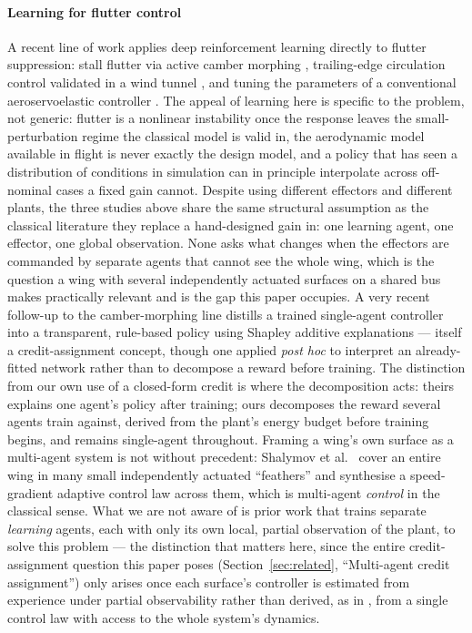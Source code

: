 \documentclass[preprint,11pt,authoryear]{elsarticle}
\begin{document}
\paragraph{Learning for flutter control}
A recent line of work applies deep reinforcement learning directly to flutter
suppression: stall flutter via active camber morphing
\citep{stallflutter2025}, trailing-edge circulation control validated in a wind
tunnel \citep{circulation2023}, and tuning the parameters of a conventional
aeroservoelastic controller \citep{flyingwing2022}. The appeal of learning here
is specific to the problem, not generic: flutter is a nonlinear instability once
the response leaves the small-perturbation regime the classical model is valid
in, the aerodynamic model available in flight is never exactly the design model,
and a policy that has seen a distribution of conditions in simulation can in
principle interpolate across off-nominal cases a fixed gain cannot. Despite
using different effectors and different plants, the three studies above share
the same structural assumption as the classical literature they replace a
hand-designed gain in: one learning agent, one effector, one global observation.
None asks what changes when the effectors are commanded by separate agents that
cannot see the whole wing, which is the question a wing with several
independently actuated surfaces on a shared bus makes practically relevant and
is the gap this paper occupies. A very recent follow-up to the camber-morphing
line distills a trained single-agent controller into a transparent, rule-based
policy using Shapley additive explanations \citep{shapley2026stallflutter} ---
itself a credit-assignment concept, though one applied \emph{post hoc} to
interpret an already-fitted network rather than to decompose a reward before
training. The distinction from our own use of a closed-form credit is where
the decomposition acts: theirs explains one agent's policy after training;
ours decomposes the reward several agents train against, derived from the
plant's energy budget before training begins, and remains single-agent
throughout. Framing a wing's own surface as a multi-agent
system is not without precedent: Shalymov et al.\
\citep{shalymov2020feathers} cover an entire wing in many small independently
actuated ``feathers'' and synthesise a speed-gradient adaptive control law
across them, which is multi-agent \emph{control} in the classical sense. What
we are not aware of is prior work that trains separate \emph{learning} agents,
each with only its own local, partial observation of the plant, to solve this
problem --- the distinction that matters here, since the entire credit-assignment
question this paper poses (Section~\ref{sec:related}, ``Multi-agent credit
assignment'') only arises once each surface's controller is estimated from
experience under partial observability rather than derived, as in
\citep{shalymov2020feathers}, from a single control law with access to the
whole system's dynamics.
\end{document}
